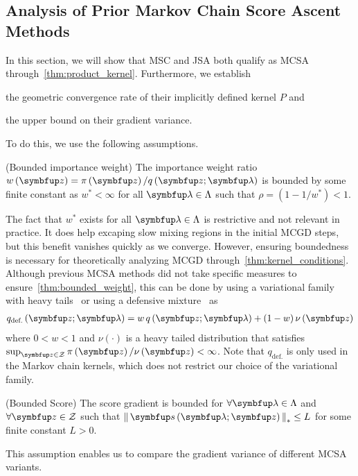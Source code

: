 \subsection{Analysis of Prior Markov Chain Score Ascent Methods}\label{section:comparison}
\vspace{-0.05in}
In this section, we will show that MSC and JSA both qualify as MCSA through~\cref{thm:product_kernel}.
Furthermore, we establish 
\begin{enumerate*}[label=\textbf{(\roman*)}]
  \item the geometric convergence rate of their implicitly defined kernel \(P\) and
  \item the upper bound on their gradient variance.
\end{enumerate*}
To do this, we use the following assumptions.
\begin{assumption}{(Bounded importance weight)}\label{thm:bounded_weight}
  The importance weight ratio \(w\left(\vz\right) = \pi\left(\vz\right) / q\left(\vz; \vlambda\right)\) is bounded by some finite constant as \(w^* < \infty\) for all \(\vlambda \in \Lambda\) such that \(\rho = \left(1 - 1/w^*\right) < 1\).
\end{assumption}
\vspace{-0.05in}
The fact that \(w^*\) exists for all \(\vlambda \in \Lambda\) is restrictive and not relevant in practice.
It does help excaping slow mixing regions in the initial MCGD steps, but this benefit vanishes quickly as we converge.
However, ensuring boundedness is necessary for theoretically analyzing MCGD through~\cref{thm:kernel_conditions}.
Although previous MCSA methods did not take specific measures to ensure~\cref{thm:bounded_weight}, this can be done by using a variational family with heavy tails~\citep{NEURIPS2018_25db67c5} or using a defensive mixture~\citep{hesterberg_weighted_1995, holden_adaptive_2009} as
\begin{align*}
  q_{\text{def.}}\left(\vz; \vlambda \right) = w \, q\left(\vz; \vlambda\right) + (1 - w) \, \nu\left(\vz\right)
\end{align*}
where \(0 < w < 1\) and \(\nu\left(\cdot\right)\) is a heavy tailed distribution that satisfies \(\sup_{\vz \in \mathcal{Z}} \pi\left(\vz\right) / \nu\left(\vz\right) < \infty\).
Note that \(q_{\text{def.}}\) is only used in the Markov chain kernels, which does not restrict our choice of the variational family.

\begin{assumption}{(Bounded Score)}\label{thm:bounded_score}
  The score gradient is bounded for \(\forall \vlambda \in \Lambda\) and \(\forall \vz \in \mathcal{Z}\) such that \(\norm{\vs\left(\vlambda; \vz\right)}_* \leq L \) for some finite constant \(L > 0\).
\end{assumption}
\vspace{-0.05in}
This assumption enables us to compare the gradient variance of different MCSA variants.

